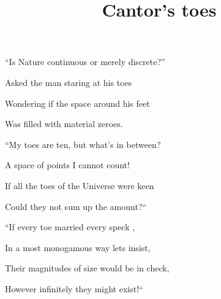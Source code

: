 \documentclass{article}
\title{Cantor's toes}
\begin{document}
 \newline

``Is Nature continuous or merely discrete?''

Asked the man staring at his toes

Wondering if the space around his feet

Was filled with material zeroes.

\newline \newline

``My toes are ten, but what's in between?

A space of points I cannot count!

If all the toes of the Universe were keen

Could they not sum up the amount?``

\newline \newline

``If every toe married every speck ,

In a most monogamous way lets insist,

Their magnitudes of size would be in check,

However infinitely they might exist!``
\end{document}
